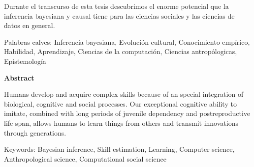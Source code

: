 \documentclass[a4paper,10pt]{book}
\theoremstyle{definition}
\begin{document}

Durante el transcurso de esta tesis descubrimos el enorme potencial que la inferencia bayesiana y causal tiene para las ciencias sociales y las ciencias de datos en general.

\vspace{0.3cm}

\noindent Palabras calves: Inferencia bayesiana, Evolución cultural, Conocimiento empírico, Habilidad, Aprendizaje, Ciencias de la computación, Ciencias antropólogicas, Epistemología


\newpage

\begin{center}
\textbf{Abstract}
\end{center}



Humans develop and acquire complex skills because of an special integration of biological, cognitive and social processes.
%
Our exceptional cognitive ability to imitate, combined with long periods of juvenile dependency and postreproductive life span, allows humans to learn things from others and transmit innovations through generations.



\vspace{0.3cm}

\noindent Keywords: Bayesian inference, Skill estimation, Learning, Computer science, Anthropological science, Computational social science 



\tableofcontents

\newpage 
\end{document}
